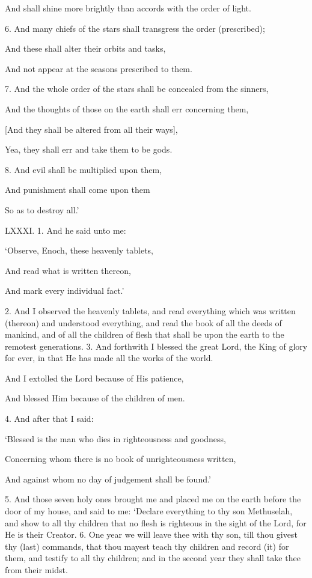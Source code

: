 And shall shine more brightly than accords with the order of light.

6. And many chiefs of the stars shall transgress the order (prescribed);

And these shall alter their orbits and tasks,

And not appear at the seasons prescribed to them.

7. And the whole order of the stars shall be concealed from the sinners,

And the thoughts of those on the earth shall err concerning them,

[And they shall be altered from all their ways],

Yea, they shall err and take them to be gods.

8. And evil shall be multiplied upon them,

And punishment shall come upon them

So as to destroy all.’


LXXXI. 1. And he said unto me:

‘Observe, Enoch, these heavenly tablets,

And read what is written thereon,

And mark every individual fact.’

2. And I observed the heavenly tablets, and read
everything which was written (thereon) and understood
everything, and read the book of all the deeds
of mankind, and of all the children of flesh that shall
be upon the earth to the remotest generations. 3. And
forthwith I blessed the great Lord, the King of glory
for ever, in that He has made all the works of the world.

And I extolled the Lord because of His patience,

And blessed Him because of the children of men.

4. And after that I said:

‘Blessed is the man who dies in righteousness and goodness,

Concerning whom there is no book of unrighteousness written,

And against whom no day of judgement shall be found.’

5. And those seven holy ones brought me and
placed me on the earth before the door of my house,
and said to me: ‘Declare everything to thy son
Methuselah, and show to all thy children that no
flesh is righteous in the sight of the Lord, for He is
their Creator. 6. One year we will leave thee with
thy son, till thou givest thy (last) commands, that thou
mayest teach thy children and record (it) for them,
and testify to all thy children; and in the second
year they shall take thee from their midst.

